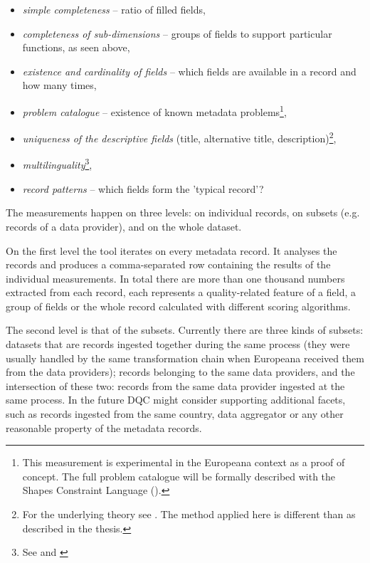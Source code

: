 \begin{itemize}
 \setlength{\parskip}{0pt}
 \setlength{\itemsep}{0pt plus 1pt}
\item \emph{simple completeness} – ratio of filled fields,
\item \emph{completeness of sub-dimensions} – groups of fields to support particular functions, as seen above,
\item \emph{existence and cardinality of fields} – which fields are available in a record and how many times,
\item \emph{problem catalogue} – existence of known metadata problems\footnote{This measurement is experimental in the Europeana context as a proof of concept. The full problem catalogue will be formally described with the Shapes Constraint Language (\cite{knublauch2017}).},
\item \emph{uniqueness of the descriptive fields} (title, alternative title, description)\footnote{For the underlying theory see \cite{al-gumaei2016}. The method applied here is different than as described in the thesis.},
\item \emph{multilinguality}\footnote{See \cite{charles2017} and \cite{stiller-kiraly2017}},
\item \emph{record patterns} – which fields form the 'typical record'?
\end{itemize}

The measurements happen on three levels: on individual records, on subsets (e.g. records of a data provider), and on the whole dataset.

On the first level the tool iterates on every metadata record. It analyses the records and produces a comma-separated row containing the results of the individual measurements. In total there are more than one thousand numbers extracted from each record, each represents a quality-related feature of a field, a group of fields or the whole record calculated with different scoring algorithms.

The second level is that of the subsets. Currently there are three kinds of subsets: datasets that are records ingested together during the same process (they were usually handled by the same transformation chain when Europeana received them from the data providers); records belonging to the same data providers, and the intersection of these two: records from the same data provider ingested at the same process. In the future DQC might consider supporting additional facets, such as records ingested from the same country, data aggregator or any other reasonable property of the metadata records.

